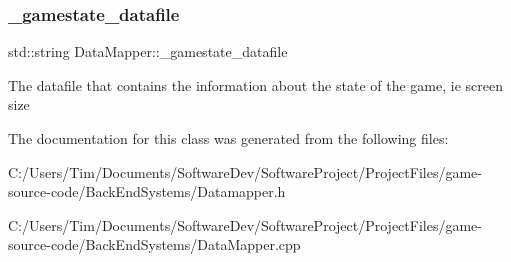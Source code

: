 \subsubsection{\texorpdfstring{\+\_\+gamestate\+\_\+datafile}{\_gamestate\_datafile}}
{\footnotesize\ttfamily std\+::string Data\+Mapper\+::\+\_\+gamestate\+\_\+datafile\hspace{0.3cm}{\ttfamily [private]}}

The datafile that contains the information about the state of the game, ie screen size 

The documentation for this class was generated from the following files\+:\begin{DoxyCompactItemize}
\item 
C\+:/\+Users/\+Tim/\+Documents/\+Software\+Dev/\+Software\+Project/\+Project\+Files/game-\/source-\/code/\+Back\+End\+Systems/Datamapper.\+h\item 
C\+:/\+Users/\+Tim/\+Documents/\+Software\+Dev/\+Software\+Project/\+Project\+Files/game-\/source-\/code/\+Back\+End\+Systems/Data\+Mapper.\+cpp\end{DoxyCompactItemize}
